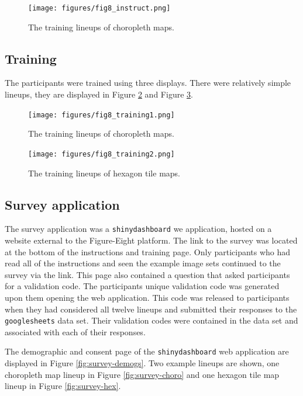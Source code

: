 \documentclass{monashthesis}
\begin{document}
\begin{figure}[H]
\centering
\texttt{[image: figures/fig8\_instruct.png]}
\caption{\label{fig:instruct}The training lineups of choropleth maps.}
\end{figure}

\hypertarget{training}{%
\subsection{Training}\label{training}}

The participants were trained using three displays. There were relatively simple lineups, they are displayed in Figure \ref{fig:training1} and Figure \ref{fig:training2}.

\begin{figure}[H]
\centering
\texttt{[image: figures/fig8\_training1.png]}
\caption{\label{fig:training1}The training lineups of choropleth maps.}
\end{figure}

\begin{figure}[H]
\centering
\texttt{[image: figures/fig8\_training2.png]}
\caption{\label{fig:training2}The training lineups of hexagon tile maps.}
\end{figure}

\hypertarget{survey-application}{%
\subsection{Survey application}\label{survey-application}}

The survey application was a \texttt{shinydashboard} we application, hosted on a website external to the Figure-Eight platform. The link to the survey was located at the bottom of the instructions and training page. Only participants who had read all of the instructions and seen the example image sets continued to the survey via the link.
This page also contained a question that asked participants for a validation code. The participants unique validation code was generated upon them opening the web application. This code was released to participants when they had considered all twelve lineups and submitted their responses to the \texttt{googlesheets} data set. Their validation codes were contained in the data set and associated with each of their responses.

The demographic and consent page of the \texttt{shinydashboard} web application are displayed in Figure \ref{fig:survey-demogs}. Two example lineups are shown, one choropleth map lineup in Figure \ref{fig:survey-choro} and one hexagon tile map lineup in Figure \ref{fig:survey-hex}.
\end{document}
